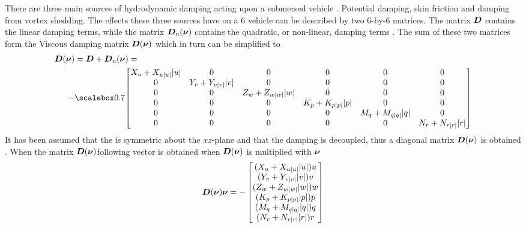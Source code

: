 There are three main sources of hydrodynamic damping acting upon a submersed vehicle \citep[p. 122]{fossen2011}.
Potential damping, skin friction and damping from vortex shedding. The effects these three sources have on a 6 \abbrDOF vehicle can be described by two 6-by-6 matrices.
The matrix $\boldsymbol{D}$ contains the linear damping terms, while the matrix $\boldsymbol{D}_{\text{n}}(\boldsymbol{\nu})$ contains the quadratic, or non-linear, damping terms \citep{fossen2011}. The sum of these two matrices form the Viscous damping matrix $\boldsymbol{D}(\boldsymbol{\nu})$ which in turn can be simplified to
\begin{equation}
\begin{split}
    \damping(\nuVector) &= \damping + \damping_{\text{n}}(\nuVector) = \\
    -& \scalemath{0.7}{\begin{bmatrix}
        \Xu+\Xuabsu\abs{u} & 0 & 0 & 0 & 0 & 0 \\
        0 & \Yv+\Yvabsv\abs{v} & 0 & 0 & 0 & 0 \\
        0 & 0 & \Zw+\Zwabsw\abs{w} & 0 & 0 & 0 \\
        0 & 0 & 0 & \Kp+\Kpabsp\abs{p} & 0 & 0 \\
        0 & 0 & 0 & 0 & \Mq+\Mqabsq\abs{q} & 0 \\
        0 & 0 & 0 & 0 & 0 & \Nr+\Nrabsr\abs{r} \\
    \end{bmatrix}}
\end{split}
\end{equation}
It has been assumed that the \abbrROV is symmetric about the $xz$-plane and that the damping is decoupled, thus a diagonal matrix $\boldsymbol{D}(\boldsymbol{\nu})$ is obtained \citep[p. 129-130]{fossen2011}. When the matrix $\boldsymbol{D}(\boldsymbol{\nu})$following vector is obtained when $\boldsymbol{D}(\boldsymbol{\nu})$ is multiplied with $\boldsymbol{\nu}$
\begin{equation}
    \boldsymbol{D}(\boldsymbol{\nu}) \boldsymbol{\nu} =
     -\begin{bmatrix}
    (X_{u} + X_{u|u|} |u|) u\\
    (Y_{v} + Y_{v|v|} |v|) v\\
    (Z_{w} + Z_{w|w|} |w|) w\\
    (K_{p} + K_{p|p|} |p|) p\\
    (M_{q} + M_{q|q|} |q|) q\\
    (N_{r} + N_{r|r|} |r|) r\\
    \end{bmatrix}    
\end{equation}

